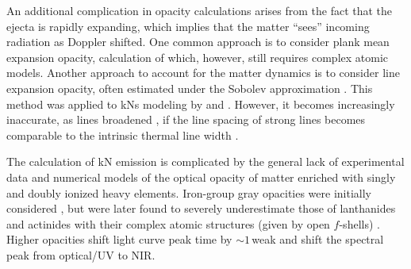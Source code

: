 An additional complication in opacity calculations arises from the 
fact that the ejecta is rapidly expanding, which implies that the 
matter ``sees'' incoming radiation as Doppler shifted. 
%
One common approach is to consider plank mean expansion opacity, 
calculation of which, however, still requires complex atomic models.
%
Another approach to account for the matter dynamics is to consider 
line expansion opacity, often estimated under the Sobolev approximation 
\citep{Pinto:2000}.
%
This method was applied to \acp{kN} modeling by \citet{Barnes:2013wka} 
and \citet{Tanaka:2013ana}. 
However, it becomes increasingly inaccurate, as lines broadened 
\ie, if the line spacing of strong lines becomes comparable to the intrinsic 
thermal line width \citep{Kasen:2013xka,Fontes:2015,Fontes:2017zfb}. 



The calculation of \ac{kN} emission is complicated by the %
general lack of experimental data and numerical models of the optical opacity 
of matter enriched with singly and doubly ionized heavy \rproc{} elements. 
Iron-group gray opacities were initially considered \citep{Roberts:2011}, 
but were later found to severely underestimate those of 
lanthanides and actinides with their 
complex atomic structures (given by open $f$-shells) 
\citep{Kasen:2013xka,Tanaka:2013ana}. 
%
Higher opacities shift light curve peak time by ${\sim}1\,$weak \citep{Barnes:2013wka} 
and shift the spectral peak from optical/\ac{UV} to \ac{NIR}.

